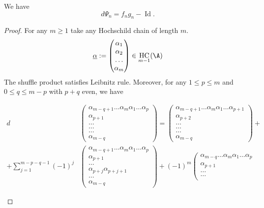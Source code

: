 \documentclass[12pt,a4paper,reqno]{amsart}
\DeclareMathOperator{\id}{Id}
\DeclareMathOperator{\hochcx}{{HC}}
\begin{document}
\begin{theorem}
\label{theorem-psi-is-the-homotopy-of-fg-minus-id}
We have  
$$ d\Psi_n = f_n g_n - \id. $$
\end{theorem}
\begin{proof}
For any $m \geq 1$ take any Hochschild chain of length $m$.
$$ 
\underline{\alpha} : = 
\left(
\begin{matrix}
\alpha_1 \\
\alpha_2 \\
\dots  \\
\alpha_m 
\end{matrix}
\right)
\in \hochcx_{m-1}(\A)
$$
The shuffle product satisfies Leibnitz rule. Moreover, 
for any $1 \leq p \leq m$ and $0 \leq q \leq m-p$ with $p+q$ even, we have
\begin{small}
\begin{align*}
d 
&\left(
\begin{matrix}
\alpha_{m-q+1} \dots \alpha_m \alpha_1 \dots \alpha_p \\
\alpha_{p+1} \\
\dots \\
\dots \\
\dots \\
\alpha_{m-q} 
\end{matrix}
\right)
= 
\left(
\begin{matrix}
\alpha_{m-q+1} \dots \alpha_m \alpha_1 \dots \alpha_{p+1} \\
\alpha_{p+2}\\
\dots \\
\dots \\
\dots \\
\alpha_{m-q} 
\end{matrix}
\right)
+ 
\\
+
\sum_{j = 1}^{m-p-q-1}
(-1)^{j}
&\left(
\begin{matrix}
\alpha_{m-q+1} \dots \alpha_m \alpha_1 \dots \alpha_p \\
\alpha_{p+1} \\
\dots \\
\alpha_{p+j}\alpha_{p+j+1} \\
\dots \\
\alpha_{m-q} 
\end{matrix}
\right)
+
(-1)^{m}
\left(
\begin{matrix}
\alpha_{m-q} \dots \alpha_m \alpha_1 \dots \alpha_p \\
\alpha_{p+1} \\
\dots \\
\dots \\

\end{matrix}
\end{align*}
\end{small}
\end{proof}
\end{document}
